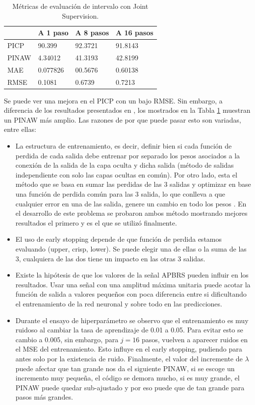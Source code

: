 \documentclass[12pt]{article}
\begin{document}
\begin{table}[h!]
	\centering
	\caption{Métricas de evaluación de intervalo con Joint Supervision.}
	\begin{tabular}{|l|l|l|l|}
		\hline
		& A 1 paso &A 8 pasos & A 16 pasos \\\hline
		PICP     &  90.399   &  92.3721   & 91.8143   \\ \hline
		PINAW    & 4.34012   & 41.3193    & 42.8199    \\ \hline
		MAE & 0.077826&00.5676 & 0.60138\\ \hline
		RMSE & 0.1081&0.6739&0.7213\\ \hline
	\end{tabular}
	\label{tab_js}
\end{table}

Se puede ver una mejora en el PICP con un bajo RMSE. Sin embargo, a diferencia de los resultados presentados en \cite{cruz_neural_2018}, los mostrados en la Tabla \ref{tab_js} muestran un PINAW más amplio. Las razones de por que puede pasar esto son variadas, entre ellas:
\begin{itemize}
	\item La estructura de entrenamiento, es decir, definir bien si cada función de perdida de cada salida debe entrenar por separado los pesos asociados a la conexión de la salida de la capa oculta y dicha salida (método de salidas independiente con solo las capas ocultas en común). Por otro lado, esta el método que se basa en sumar las perdidas de las 3 salidas y optimizar en base una función de perdida común para las 3 salida, lo que conlleva a que cualquier error en una de las salida, genere un cambio en todo los pesos \cite{noauthor_multi-task_nodate}. En el desarrollo de este problema se probaron ambos método mostrando mejores resultados el primero y es el que se utilizó finalmente.
	\item El uso de early stopping depende de que función de perdida estamos evaluando (upper, crisp, lower). Se puede elegir una de ellas o la suma de las 3, cualquiera de las dos tiene un impacto en las otras 3 salidas.
	\item Existe la hipótesis de que los valores de la señal APBRS pueden influir en los resultados. Usar una señal con una amplitud máxima unitaria puede acotar la función de salida a valores pequeños con poca diferencia entre si dificultando el entrenamiento de la red neuronal y sobre todo en las predicciones.
	\item Durante el ensayo de hiperparámetro se observo que el entrenamiento es muy ruidoso al cambiar la tasa de aprendizaje de 0.01 a 0.05. Para evitar esto se cambio a 0.005, sin embargo, para $j=16$ pasos, vuelven a aparecer ruidos en el MSE del entrenamiento. Esto influye en el early stopping, pudiendo para antes solo por la existencia de ruido.
	Finalmente, el valor del incremente de $\lambda$ puede afectar que tan grande nos da el siguiente PINAW, si se escoge un incremento muy pequeña, el código se demora mucho, si es muy grande, el PINAW puede quedar sub-ajustado y por eso puede que de tan grande para pasos más grandes.
\end{itemize}
\end{document}
